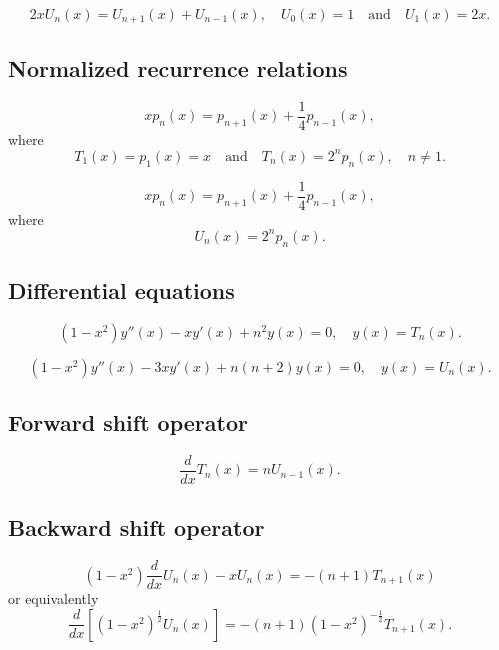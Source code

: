 \documentclass[envcountchap,graybox]{svmono}
\begin{document}
\begin{equation}
\label{RecChebyshevII}
2xU_n(x)=U_{n+1}(x)+U_{n-1}(x),\quad U_{0}(x)=1\quad\textrm{and}\quad U_1(x)=2x.
\end{equation}

\subsection*{Normalized recurrence relations}
\begin{equation}
\label{NormRecChebyshevI}
xp_n(x)=p_{n+1}(x)+\frac{1}{4}p_{n-1}(x),
\end{equation}
where
$$T_1(x)=p_1(x)=x\quad\textrm{and}\quad T_n(x)=2^np_n(x),\quad n\neq 1.$$

\begin{equation}
\label{NormRecChebyshevII}
xp_n(x)=p_{n+1}(x)+\frac{1}{4}p_{n-1}(x),
\end{equation}
where
$$U_n(x)=2^np_n(x).$$

\subsection*{Differential equations}
\begin{equation}
\label{dvChebyshevI}
(1-x^2)y''(x)-xy'(x)+n^2y(x)=0,\quad y(x)=T_n(x).
\end{equation}

\begin{equation}
\label{dvChebyshevII}
(1-x^2)y''(x)-3xy'(x)+n(n+2)y(x)=0,\quad y(x)=U_n(x).
\end{equation}

\subsection*{Forward shift operator}
\begin{equation}
\label{shift1Chebyshev}
\frac{d}{dx}T_n(x)=nU_{n-1}(x).
\end{equation}

\subsection*{Backward shift operator}
\begin{equation}
\label{shift2ChebyshevI}
(1-x^2)\frac{d}{dx}U_n(x)-xU_n(x)=-(n+1)T_{n+1}(x)
\end{equation}
or equivalently
\begin{equation}
\label{shift2ChebyshevII}
\frac{d}{dx}\left[\left(1-x^2\right)^{\frac{1}{2}}U_n(x)\right]
=-(n+1)\left(1-x^2\right)^{-\frac{1}{2}}T_{n+1}(x).
\end{equation}
\end{document}
